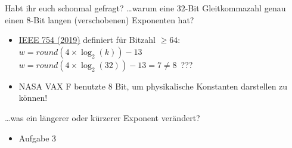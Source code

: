\begin{frame}{Habt ihr euch schonmal gefragt?}\onslide<+->
    \dots warum eine \(32\)-Bit Gleitkommazahl genau einen 8-Bit langen (verschobenen) Exponenten hat?
    \begin{itemize}[<+->]
        \item \href{https://ieeexplore.ieee.org/document/8766229}{IEEE 754 (2019)} definiert für Bitzahl \(\geq 64\): \(w = round(4\times \log_2(k))-13\)\onslide<+->\\
            \(w = round(4\times \log_2(32))-13 = 7 \neq 8\)~???
        \item NASA VAX F benutzte 8 Bit, um physikalische Konstanten darstellen zu können!
    \end{itemize}
    
    \onslide<+->\dots was ein längerer oder kürzerer Exponent verändert?
    \begin{itemize}
        \item[\faAngleRight]<+-> Aufgabe 3
    \end{itemize}
\end{frame}

